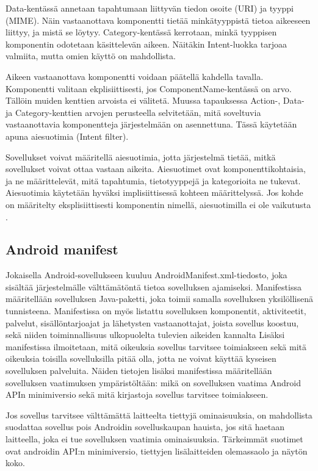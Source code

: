 Data-kentässä annetaan tapahtumaan liittyvän tiedon osoite (URI) ja tyyppi (MIME). Näin vastaanottava komponentti tietää minkätyyppistä tietoa aikeeseen liittyy, ja mistä se löytyy. Category-kentässä kerrotaan, minkä tyyppisen komponentin odotetaan käsittelevän aikeen. Näitäkin Intent-luokka tarjoaa valmiita, mutta omien käyttö on mahdollista.

Aikeen vastaanottava komponentti voidaan päätellä kahdella tavalla. Komponentti valitaan ekplisiittisesti, jos ComponentName-kentässä on arvo. Tällöin muiden kenttien arvoista ei välitetä. Muussa tapauksessa Action-, Data- ja Category-kenttien arvojen perusteella selvitetään, mitä soveltuvia vastaanottavia komponentteja järjestelmään on asennettuna. Tässä käytetään apuna aiesuotimia (Intent filter).

Sovellukset voivat määritellä aiesuotimia, jotta järjestelmä tietää, mitkä sovellukset voivat ottaa vastaan aikeita. Aiesuotimet ovat komponenttikohtaisia, ja ne määrittelevät, mitä tapahtumia, tietotyyppejä ja kategorioita ne tukevat. Aiesuotimia käytetään hyväksi implisiittisessä kohteen määrittelyssä. Jos kohde on määritelty eksplisiittisesti komponentin nimellä, aiesuotimilla ei ole vaikutusta \cite{android}.

\subsection{Android manifest}

Jokaisella Android-sovellukseen kuuluu AndroidManifest.xml-tiedosto, joka sisältää järjestelmälle välttämätöntä tietoa sovelluksen ajamiseksi. Manifestissa määritellään sovelluksen Java-paketti, joka toimii samalla sovelluksen yksilöllisenä tunnisteena. Manifestissa on myös listattu sovelluksen komponentit, aktiviteetit, palvelut, sisällöntarjoajat ja lähetysten vastaanottajat, joista sovellus koostuu, sekä niiden toiminnallisuus ulkopuolelta tulevien aikeiden kannalta Lisäksi manifestissa ilmoitetaan, mitä oikeuksia sovellus tarvitsee toimiakseen sekä mitä oikeuksia toisilla sovelluksilla pitää olla, jotta ne voivat käyttää kyseisen sovelluksen palveluita. Näiden tietojen lisäksi manifestissa määritellään sovelluksen vaatimuksen ympäristöltään: mikä on sovelluksen vaatima Android APIn minimiversio sekä mitä kirjastoja sovellus tarvitsee toimiakseen. \cite{android}

Jos sovellus tarvitsee välttämättä laitteelta tiettyjä ominaisuuksia, on mahdollista suodattaa sovellus pois Androidin sovelluskaupan hauista, jos sitä haetaan laitteella, joka ei tue sovelluksen vaatimia ominaisuuksia. Tärkeimmät suotimet ovat androidin API:n minimiversio, tiettyjen lisälaitteiden olemassaolo ja näytön koko.

